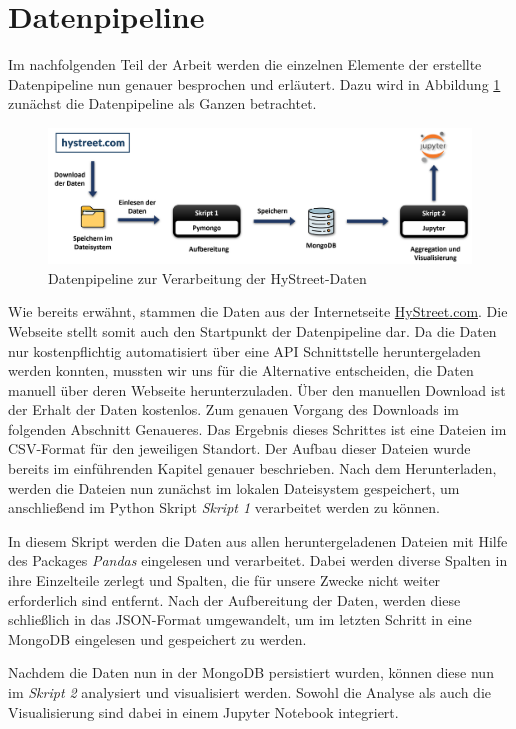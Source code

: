\section{Datenpipeline}

Im nachfolgenden Teil der Arbeit werden die einzelnen Elemente der erstellte Datenpipeline nun genauer besprochen und erläutert. Dazu wird in Abbildung \ref{fig:datenpipelineFull} zunächst die Datenpipeline als Ganzen betrachtet.

\begin{figure}[h!]
    \vspace{1cm}
    \centering
    \includegraphics[width=0.9\linewidth]{images/datenpipeline.png}
    \caption{Datenpipeline zur Verarbeitung der HyStreet-Daten}
    \label{fig:datenpipelineFull}
    \vspace{0.5cm}
\end{figure}

Wie bereits erwähnt, stammen die Daten aus der Internetseite \href{https://hystreet.com}{HyStreet.com}. Die Webseite stellt somit auch den Startpunkt der Datenpipeline dar. Da die Daten nur kostenpflichtig automatisiert über eine API Schnittstelle heruntergeladen werden konnten, mussten wir uns für die Alternative entscheiden, die Daten manuell über deren Webseite herunterzuladen. Über den manuellen Download ist der Erhalt der Daten kostenlos. Zum genauen Vorgang des Downloads im folgenden Abschnitt Genaueres. Das Ergebnis dieses Schrittes ist eine Dateien im CSV-Format für den jeweiligen Standort. Der Aufbau dieser Dateien wurde bereits im einführenden Kapitel genauer beschrieben. Nach dem Herunterladen, werden die Dateien nun zunächst im lokalen Dateisystem gespeichert, um anschließend im Python Skript \emph{Skript 1} verarbeitet werden zu können.
\bigbreak

In diesem Skript werden die Daten aus allen heruntergeladenen Dateien mit Hilfe des Packages \emph{Pandas} eingelesen und verarbeitet. Dabei werden diverse Spalten in ihre Einzelteile zerlegt und Spalten, die für unsere Zwecke nicht weiter erforderlich sind entfernt. Nach der Aufbereitung der Daten, werden diese schließlich in das JSON-Format umgewandelt, um im letzten Schritt in eine MongoDB eingelesen und gespeichert zu werden.
\bigbreak

Nachdem die Daten nun in der MongoDB persistiert wurden, können diese nun im \emph{Skript 2} analysiert und visualisiert werden. Sowohl die Analyse als auch die Visualisierung sind dabei in einem Jupyter Notebook integriert.